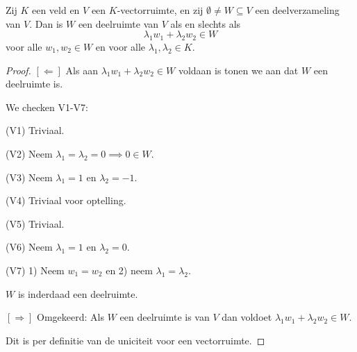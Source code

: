 \begin{lemma}[2.2.3]
    Zij $K$ een veld en $V$ een $K$-vectorruimte, en zij $\emptyset \neq W \subseteq V$ een deelverzameling van $V$. Dan is $W$ een deelruimte van $V$ als en slechts als
    \[ \lambda_1 w_1 + \lambda_2 w_2 \in W \]
    voor alle $w_1, w_2 \in W$ en voor alle $\lambda_1, \lambda_2 \in K$.
\end{lemma}
\begin{proof}

    \([\Leftarrow]\) Als aan \( \lambda_1 w_1 + \lambda_2 w_2 \in W \) voldaan is tonen we aan dat \(W\) een deelruimte is.

    We checken V1-V7:

    (V1) Triviaal.

    (V2) Neem \(\lambda_1 = \lambda_2 = 0 \implies 0 \in W \).

    (V3) Neem \(\lambda_1 = 1 \) en \( \lambda_2 = -1\).

    (V4) Triviaal voor optelling.

    (V5) Triviaal.

    (V6) Neem \(\lambda_1 = 1\) en \(\lambda_2 = 0\).

    (V7) 1) Neem \(w_1 = w_2\) en 2) neem \(\lambda_1 = \lambda_2\).

    \(W\) is inderdaad een deelruimte.

    \([\Rightarrow]\) Omgekeerd: Als \(W\) een deelruimte is van \(V\) dan voldoet
    \( \lambda_1 w_1 + \lambda_2 w_2 \in W .\)

    Dit is per definitie van de uniciteit voor een vectorruimte.
\end{proof}

